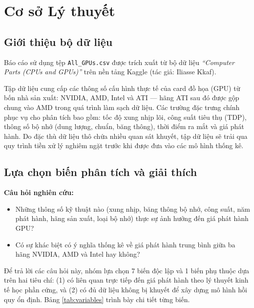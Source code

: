 \documentclass[a4paper]{article}
\begin{document}
\section{Cơ sở Lý thuyết}

\subsection{Giới thiệu bộ dữ liệu}

Báo cáo sử dụng tệp \texttt{All\_GPUs.csv} được trích xuất từ bộ dữ liệu \textit{``Computer Parts (CPUs and GPUs)''} trên nền tảng Kaggle (tác giả: Iliasse Kkaf).

Tập dữ liệu cung cấp các thông số cấu hình thực tế của card đồ họa (GPU) từ bốn nhà sản xuất: NVIDIA, AMD, Intel và ATI --- hãng ATI sau đó được gộp chung vào AMD trong quá trình làm sạch dữ liệu. Các trường đặc trưng chính phục vụ cho phân tích bao gồm: tốc độ xung nhịp lõi, công suất tiêu thụ (TDP), thông số bộ nhớ (dung lượng, chuẩn, băng thông), thời điểm ra mắt và giá phát hành. Do đặc thù dữ liệu thô chứa nhiều quan sát khuyết, tập dữ liệu sẽ trải qua quy trình tiền xử lý nghiêm ngặt trước khi được đưa vào các mô hình thống kê.

\subsection{Lựa chọn biến phân tích và giải thích}

\textbf{Câu hỏi nghiên cứu:}
\begin{itemize}
    \item Những thông số kỹ thuật nào (xung nhịp, băng thông bộ nhớ, công suất, năm phát hành, hãng sản xuất, loại bộ nhớ) thực sự ảnh hưởng đến giá phát hành GPU?
    \item Có sự khác biệt có ý nghĩa thống kê về giá phát hành trung bình giữa ba hãng NVIDIA, AMD và Intel hay không?
\end{itemize}

Để trả lời các câu hỏi này, nhóm lựa chọn 7 biến độc lập và 1 biến phụ thuộc dựa trên hai tiêu chí: (1) có liên quan trực tiếp đến giá phát hành theo lý thuyết kinh tế học phần cứng, và (2) có đủ dữ liệu không bị khuyết để xây dựng mô hình hồi quy ổn định. Bảng \ref{tab:variables} trình bày chi tiết từng biến.
\end{document}

